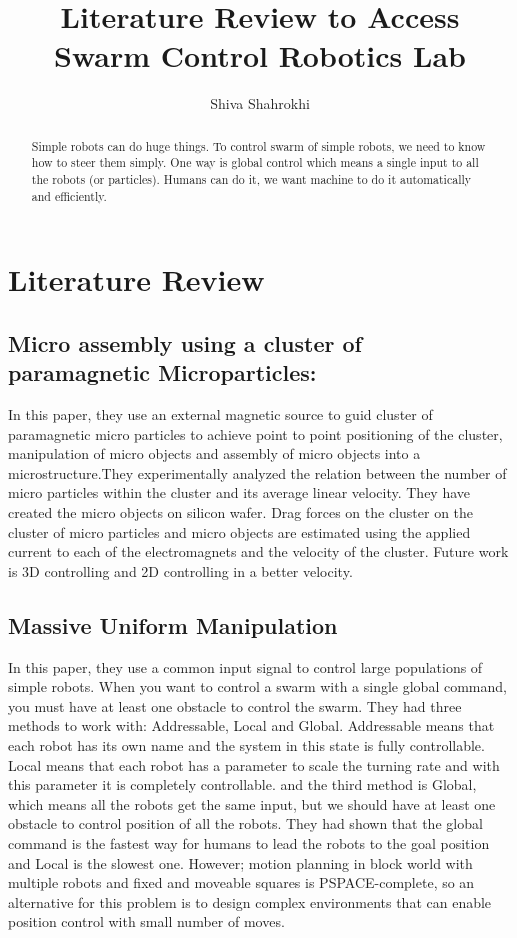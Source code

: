 \documentclass[letterpaper, 10 pt, conference]{ieeeconf}
\begin{document}
\author{Shiva Shahrokhi}
\title{Literature Review to Access Swarm Control Robotics Lab}
\maketitle

\begin{abstract}

Simple robots can do huge things. To control swarm of simple robots, we need to know how to steer them simply. One way is global control which means a single input to all the robots (or particles). Humans can do it, we want machine to do it automatically and efficiently.
 
\end{abstract}

\section{Literature Review}
\subsection{Micro assembly using a cluster of paramagnetic Microparticles:}

In this paper, they use an external magnetic source to guid cluster of paramagnetic micro particles to achieve point to point positioning of the cluster, manipulation of micro objects and assembly of micro objects into a microstructure.They experimentally analyzed the relation between the number of micro particles within the cluster and its average linear velocity. They have created the micro objects on silicon wafer. Drag forces on the cluster on the cluster of micro particles and micro objects are estimated using the applied current to each of the electromagnets and the velocity of the cluster. Future work is 3D controlling and 2D controlling in a better velocity.\cite{Khalil2013}

\subsection{Massive Uniform Manipulation}

In this paper, they use a common input signal to control large populations of simple robots. When you want to control a swarm with a single global command, you must have at least one obstacle to control the swarm. They had three methods to work with: Addressable, Local and Global. Addressable means that each robot has its own name and the system in this state is fully controllable. Local means that each robot has a parameter to scale the turning rate and with this parameter it is completely controllable. and the third method is Global, which means all the robots get the same input, but we should have at least one obstacle to control position of all the robots. They had shown that the global command is the fastest way for humans to lead the robots to the goal position and Local is the slowest one. However; motion planning in block world with multiple robots and fixed and moveable squares is PSPACE-complete, so an alternative for this problem is to design complex environments that can enable position control with small number of moves. \cite{AaronManipulation2013}

\subsection{}
 


\end{document}
